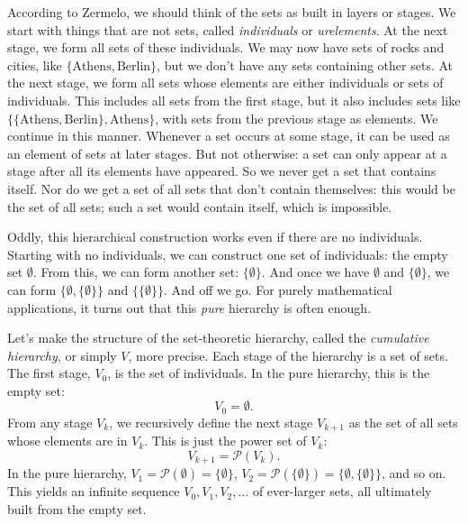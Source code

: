 According to Zermelo,
we should think of the sets as built in layers or stages.
We start with things that are not sets,
called \textit{individuals} or \textit{urelements}.
At the next stage,
we form all sets of these individuals.
We may now have sets of rocks and cities,
like $\{ \text{Athens}, \text{Berlin} \}$,
but we don't have any sets containing other sets.
At the next stage,
we form all sets whose elements are either individuals or sets of individuals.
This includes all sets from the first stage,
but it also includes sets like $\{ \{\text{Athens}, \text{Berlin}\}, \text{Athens} \}$,
with sets from the previous stage as elements.
We continue in this manner.
Whenever a set occurs at some stage,
it can be used as an element of sets at later stages.
But not otherwise:
a set can only appear at a stage after all its elements have appeared.
So we never get a set that contains itself.
Nor do we get a set of all sets that don't contain themselves:
this would be the set of all sets;
such a set would contain itself,
which is impossible.

Oddly,
this hierarchical construction works
even if there are no individuals.
Starting with no individuals,
we can construct one set of individuals:
the empty set $\emptyset$.
From this,
we can form another set: $\{ \emptyset \}$.
And once we have $\emptyset$ and $\{ \emptyset \}$,
we can form $\{ \emptyset, \{ \emptyset \} \}$ and $\{ \{ \emptyset \} \}$.
And off we go.
For purely mathematical applications,
it turns out that this \emph{pure} hierarchy is often enough.

Let's make the structure of the set-theoretic hierarchy,
called the \emph{cumulative hierarchy}, or simply $V$,
more precise.
Each stage of the hierarchy is a set of sets.
The first stage, $V_0$, is the set of individuals.
In the pure hierarchy,
this is the empty set:
\[
  V_{0} = \emptyset.
\]
From any stage $V_k$,
we recursively define the next stage $V_{k+1}$
as the set of all sets whose elements are in $V_k$.
This is just the power set of $V_k$:
\[
  V_{k+1} = \mathcal{P}(V_{k}).
\]
In the pure hierarchy,
$V_{1} = \mathcal{P}(\emptyset) = \{ \emptyset \}$,
$V_{2} = \mathcal{P}(\{\emptyset\}) = \{\emptyset, \{\emptyset\}\}$,
and so on.
This yields an infinite sequence $V_0, V_1, V_2, \dots$ of ever-larger sets,
all ultimately built from the empty set.

